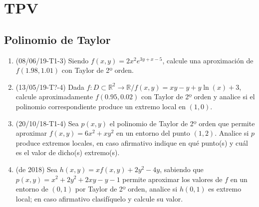 \documentclass[12pt,a4paper]{article}
\newcommand{\R}{\mathbb{R}}
\begin{document}
\section{TPV}
\subsection{Polinomio de Taylor}
\begin{enumerate}
	\item (08/06/19-T1-3) Siendo $f ( x , y ) = 2 x^2 e^{3y+x-5}$, calcule una aproximación de $f ( 1 . 98 , 1 . 01 )$ con Taylor de 2º orden.
	
	\item (13/05/19-T?-4) Dada $f : D \subset\R^2 \rightarrow \R / f ( x , y ) = x y - y + y \ln( x ) + 3$, calcule aproximadamente $f ( 0 . 95 , 0 . 02 )$ con Taylor de 2º orden y analice si el polinomio correspondiente produce un extremo local en $ ( 1 , 0 )  $.
	
	\item (20/10/18-T1-4) Sea $p ( x , y )$ el polinomio de Taylor de 2º orden que permite aproximar $f ( x , y ) = 6 x^2 + x y^2$ en un entorno del punto $( 1 , 2 )$. Analice si $p$ produce extremos locales, en caso afirmativo indique en qué	punto(s) y cuál es el valor de dicho(s) extremo(s).
	
	\item (de 2018) Sea $h(x, y) = x f(x, y) + 2 y^2 - 4 y$, sabiendo que $p(x, y) = x^2 + 2 y^2 + 2 x y - y - 1$ permite aproximar los valores de $f$ en un entorno de $(0, 1)$ por Taylor de 2º orden, analice si $h(0, 1)$ es extremo local; en caso afirmativo clasifíquelo y calcule su valor.
\end{enumerate}
\end{document}
